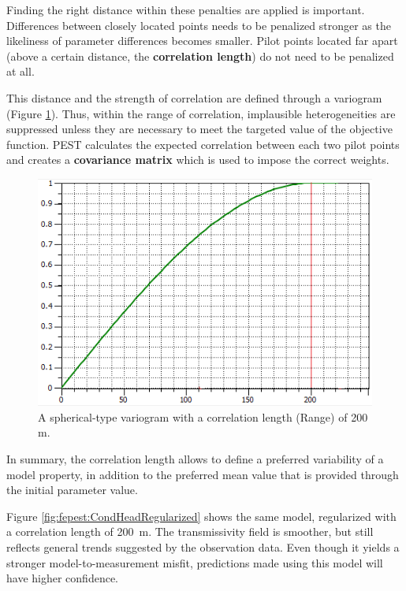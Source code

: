 Finding the right distance within these penalties are applied is important. Differences between closely located points needs to be penalized stronger as the likeliness of parameter differences becomes smaller. Pilot points located far apart (above a certain distance, the \textbf{correlation length}) do not need to be penalized at all. 

This distance and the strength of correlation are defined through a variogram (Figure \ref{fig:fepest:Variogramm200m}). Thus, within the range of correlation, implausible heterogeneities are suppressed unless they are necessary to meet the targeted value of the objective function. PEST calculates the expected correlation between each two pilot points and creates a \textbf{covariance matrix} which is used to impose the correct weights.

\begin{figure}
	\center
	\includegraphics[width=\columnwidth]{figures/Variogramm200m.png}
\caption{A spherical-type variogram with a correlation length (Range) of 200 m.}
\label{fig:fepest:Variogramm200m}
\end{figure}

In summary, the correlation length allows to define a preferred variability of a model property, in addition to the preferred mean value that is provided through the initial parameter value.

Figure \ref{fig:fepest:CondHeadRegularized} shows the same model, regularized with a correlation length of 200~m. The transmissivity field is smoother, but still reflects general trends suggested by the observation data. Even though it yields a stronger model-to-measurement misfit, predictions made using this model will have higher confidence.

